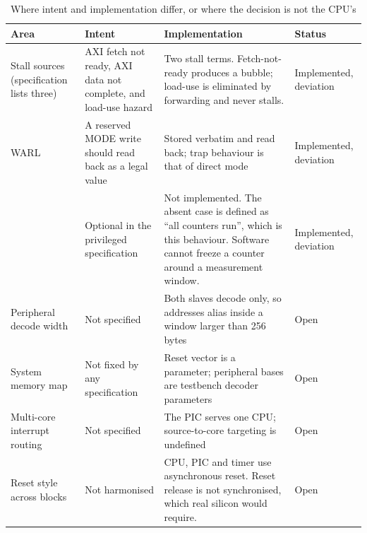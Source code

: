 \begin{table}[H]
\centering
\caption{Where intent and implementation differ, or where the decision is not the CPU's}
\label{tab:devs}
\begin{tabular}{@{}L{30mm}L{38mm}L{44mm}L{24mm}@{}}
\toprule
\textbf{Area} & \textbf{Intent} & \textbf{Implementation} & \textbf{Status} \\
\midrule
Stall sources (specification lists three) &
  AXI fetch not ready, AXI data not complete, and load-use hazard &
  Two stall terms. Fetch-not-ready produces a bubble; load-use is eliminated by
  forwarding and never stalls. &
  Implemented, deviation \\

 WARL &
  A reserved MODE write should read back as a legal value &
  Stored verbatim and read back; trap behaviour is that of direct mode &
  Implemented, deviation \\

 &
  Optional in the privileged specification &
  Not implemented. The absent case is defined as ``all counters run'', which is
  this behaviour. Software cannot freeze a counter around a measurement window. &
  Implemented, deviation \\

Peripheral decode width &
  Not specified &
  Both slaves decode  only, so addresses alias inside a window
  larger than 256\,bytes &
  Open \\

System memory map &
  Not fixed by any specification &
  Reset vector is a parameter; peripheral bases are testbench decoder parameters &
  Open \\

Multi-core interrupt routing &
  Not specified &
  The PIC serves one CPU; source-to-core targeting is undefined &
  Open \\

Reset style across blocks &
  Not harmonised &
  CPU, PIC and timer use asynchronous reset. Reset release is not synchronised,
  which real silicon would require. &
  Open \\
\bottomrule
\end{tabular}
\end{table}
